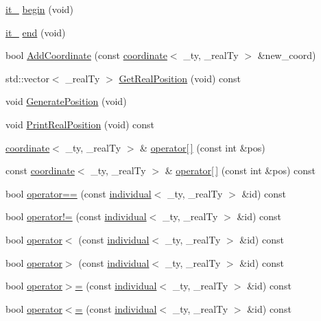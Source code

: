 \begin{DoxyCompactItemize}
\item 
\hyperlink{classindividual_a366746f769614c9cc31b42da59525c6b}{it\_\-} \hyperlink{classindividual_a593da2dd173a84dd3dec95fd505cc348}{begin} (void)
\item 
\hyperlink{classindividual_a366746f769614c9cc31b42da59525c6b}{it\_\-} \hyperlink{classindividual_a101b20b621ef6cf681ba210247c937d5}{end} (void)
\item 
bool \hyperlink{classindividual_a06553b7f9e7ae18920b6956d68aec8f9}{AddCoordinate} (const \hyperlink{classcoordinate}{coordinate}$<$ \_\-ty, \_\-realTy $>$ \&new\_\-coord)
\item 
std::vector$<$ \_\-realTy $>$ \hyperlink{classindividual_a23ee0230af928473dfb38c8d2f03a6d8}{GetRealPosition} (void) const 
\item 
void \hyperlink{classindividual_a64d3b068c2c4e652a93051ab261b06eb}{GeneratePosition} (void)
\item 
void \hyperlink{classindividual_a19b73804838e239adf7eb78ac7d4495c}{PrintRealPosition} (void) const 
\item 
\hyperlink{classcoordinate}{coordinate}$<$ \_\-ty, \_\-realTy $>$ \& \hyperlink{classindividual_a62c3d8ac9655e7cc94bd290013a7fb9c}{operator\mbox{[}$\,$\mbox{]}} (const int \&pos)
\item 
const \hyperlink{classcoordinate}{coordinate}$<$ \_\-ty, \_\-realTy $>$ \& \hyperlink{classindividual_afe28d4eab4c2cc479b00931cc5c51d1b}{operator\mbox{[}$\,$\mbox{]}} (const int \&pos) const 
\item 
bool \hyperlink{classindividual_aec35be09dd951d52d794adf07f18f555}{operator==} (const \hyperlink{classindividual}{individual}$<$ \_\-ty, \_\-realTy $>$ \&id) const 
\item 
bool \hyperlink{classindividual_a354f288f25fd01c842c91eba334cbc62}{operator!=} (const \hyperlink{classindividual}{individual}$<$ \_\-ty, \_\-realTy $>$ \&id) const 
\item 
bool \hyperlink{classindividual_a33af2ec8a3a483ddd5e188959a20f22b}{operator$<$} (const \hyperlink{classindividual}{individual}$<$ \_\-ty, \_\-realTy $>$ \&id) const 
\item 
bool \hyperlink{classindividual_a059f721458f46910431c30d5c7f8b83d}{operator$>$} (const \hyperlink{classindividual}{individual}$<$ \_\-ty, \_\-realTy $>$ \&id) const 
\item 
bool \hyperlink{classindividual_a2116152c25706d6e5eef761f8b516cbe}{operator$>$=} (const \hyperlink{classindividual}{individual}$<$ \_\-ty, \_\-realTy $>$ \&id) const 
\item 
bool \hyperlink{classindividual_a5fd9597a7c5dc2308535236c314d85e6}{operator$<$=} (const \hyperlink{classindividual}{individual}$<$ \_\-ty, \_\-realTy $>$ \&id) const 
\end{DoxyCompactItemize}
